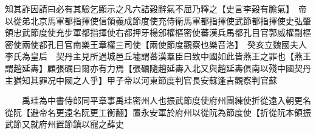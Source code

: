 知其詐因請曰必有其驗乞顯示之凡六詰穀辭氣不屈乃釋之【史言李穀有膽氣】　帝以從弟北京馬軍都指揮使信領義成節度使充侍衛馬軍都指揮使武節都指揮使史弘肇領忠武節度使充步軍都指揮使右都押牙楊邠權樞密使蕃漢兵馬都孔目官郭威權副樞密使兩使都孔目官南樂王章權三司使【兩使節度觀察也樂音洛】　癸亥立魏國夫人李氏為皇后　契丹主見所過城邑丘墟謂蕃漢羣臣曰致中國如此皆燕王之罪也【燕王謂趙延夀】顧張礪曰爾亦有力焉【張礪隨趙延夀入北又與趙延夀俱南以殘中國契丹主猶知其罪况中國之人乎】甲子帝以河東節度判官長安蘇逢吉觀察判官蘇

　　禹珪為中書侍郎同平章事禹珪密州人也振武節度使府州團練使折從遠入朝更名從阮【避帝名更遠名阮更工衡翻】置永安軍於府州以從阮為節度使【折從阮本領振武節又就府州置節鎮以寵之薛史